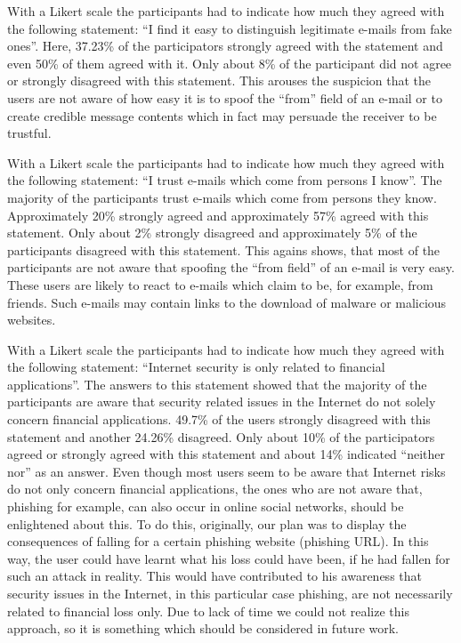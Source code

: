 \begin{description}[leftmargin=0cm]
	
	\item[Self-Assessment - Distinguish legitimate from illegitimate e-mails] With a Likert scale the participants had to indicate how much they agreed with the following statement: ``I find it easy to distinguish legitimate e-mails from fake ones''. Here, 37.23\% of the participators strongly agreed with the statement and even 50\% of them agreed with it.
 Only about 8\% of the participant did not agree or strongly disagreed with this statement.
 This arouses the suspicion that the users are not aware of how easy it is to spoof the ``from'' field of an e-mail or to create credible message contents which in fact may persuade the receiver to be trustful.

	
	\item[Self-Assessment - Trust to e-mails from known parties]  With a Likert scale the participants had to indicate how much they agreed with the following statement: ``I trust e-mails which come from persons I know''. The majority of the participants trust e-mails which come from persons they know.
 Approximately 20\% strongly agreed and approximately 57\% agreed with this statement.
 Only about 2\% strongly disagreed and approximately 5\% of the participants disagreed with this statement.
 This agains shows, that most of the participants are not aware that spoofing the ``from field'' of an e-mail is very easy.
 These users are likely to react to e-mails which claim to be, for example, from friends.
 Such e-mails may contain links to the download of malware or malicious websites.


	\item[Self-Assessment - Internet security is only related to financial applications] With a Likert scale the participants had to indicate how much they agreed with the following statement: ``Internet security is only related to financial applications''. The answers to this statement showed that the majority of the participants are aware that security related issues in the Internet do not solely concern financial applications.
 49.7\% of the users strongly disagreed with this statement and another 24.26\% disagreed.
 Only about 10\% of the participators agreed or strongly agreed with this statement and about 14\% indicated ``neither nor'' as an answer.
 Even though most users seem to be aware that Internet risks do not only concern financial applications, the ones who are not aware that, phishing for example, can also occur in online social networks, should be enlightened about this.
 To do this, originally, our plan was to display the consequences of falling for a certain phishing website (phishing URL). In this way, the user could have learnt what his loss could have been, if he had fallen for such an attack in reality.
 This would have contributed to his awareness that security issues in the Internet, in this particular case phishing, are not necessarily related to financial loss only.
 Due to lack of time we could not realize this approach, so it is something which should be considered in future work.



\end{description}
